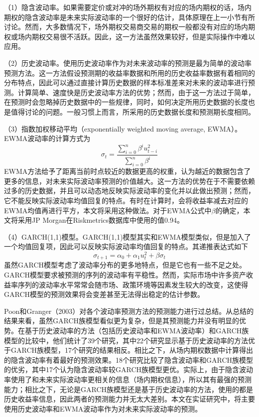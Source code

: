 （1）隐含波动率。如果需要定价或对冲的场外期权有对应的场内期权的话，场内期权的隐含波动率是未来实际波动率的一个很好的估计，具体原理在上一小节有所讨论。然而，大多数情况下，场外期权交易商交易的期权一般都没有对应的场内期权或场内期权交易很不活跃。因此，这一方法虽然效果较好，但是实际操作中难以应用。

（2）历史波动率。使用历史波动率作为对未来波动率的预测是最为简单的波动率预测方法。这一方法假设预测期的收益率数据和所用的历史收益率数据有着相同的分布特点，因此可以通过直接计算历史数据的样本标准差来对未来的波动率进行预测。计算简单、速度快是历史波动率方法的优势；然而，由于这一方法过于简单，在预测时会忽略掉历史数据中的一些规律，同时，如何决定所用历史数据的长度也是值得讨论的问题。一般习惯上而言，所采用的历史数据长度和预测期长度相同。

（3）指数加权移动平均（exponentially weighted moving average, EWMA）。EWMA波动率的计算方式为
\begin{equation}
  \sigma_t=\frac{\sum_{i=0}^n \beta^iu_{t-i}^2}{\sum_{i=0}^n \beta^i}
\end{equation}
EWMA方法给予了距离当前时点较近的数据更高的权重，认为越近的数据包含了更多的信息，对未来实际波动率预测的价值越大。这一方法的优势在于不需要依赖过多的历史数据，并且可以动态地反映实际波动率的变化并以此做出预测；然而，它不能反映实际波动率均值回复的特点。有时在计算时，会将收益率减去对应的EWMA均值再进行平方，本文将采用这种做法。对于EWMA公式中$\beta$的确定，本文将采用JP Morgan在Riskmetrics数据库中使用的值0.94。

（4）GARCH(1,1)模型。GARCH(1,1)模型其实和EWMA模型类似，但是加入了一个均值回复项，因此可以反映实际波动率均值回复的特点。其递推表达式如下
\begin{equation}
  \sigma_{t+1}=\alpha_0+\alpha_1u_t^2+\beta \sigma_t
\end{equation}
虽然GARCH模型考虑了波动率分布的更多地特点，但是它也有一些不足之处。GARCH模型要求被预测的序列的波动率有平稳性。然而，实际市场中许多资产收益率序列的波动率水平常常会随市场、政策环境等因素发生较大的改变，这使得GARCH模型的预测效果将会变差甚至无法得出稳定的估计参数。

Poon和Granger（2003）对各个波动率预测方法的预测能力进行过总结。从总结的结果来看，虽然GARCH族模型看似更为复杂，但是其预测能力并没有明显的优势。在基于历史波动率的方法（包括历史波动率和EWMA波动率）和GARCH族模型的比较中，他们统计了39个研究，其中22个研究显示基于历史波动率的方法优于GARCH族模型，17个研究的结果相反。相比之下，从场内期权数据中计算得出的隐含波动率有着最好的预测效果。18个研究比较了隐含波动率和GARCH族模型的优劣，其中17个认为隐含波动率较GARCH族模型更优。实际上，由于隐含波动率使用了和未来实际波动率更相关的信息（场内期权信息），所以其有最强的预测能力；相比之下，无论是GARCH族模型还是基于历史波动率的方法，使用的都是历史收益率信息，因此两者的预测能力并无太大差别。本文在实证研究中，将主要使用历史波动率和EWMA波动率作为对未来实际波动率的预测。


